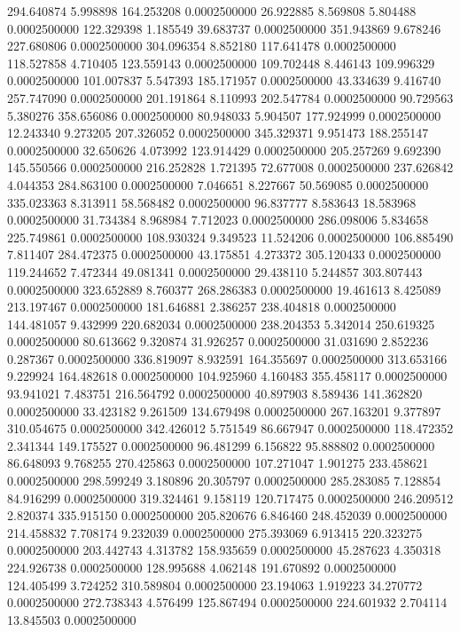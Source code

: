 294.640874 5.998898 164.253208 0.0002500000
26.922885 8.569808 5.804488 0.0002500000
122.329398 1.185549 39.683737 0.0002500000
351.943869 9.678246 227.680806 0.0002500000
304.096354 8.852180 117.641478 0.0002500000
118.527858 4.710405 123.559143 0.0002500000
109.702448 8.446143 109.996329 0.0002500000
101.007837 5.547393 185.171957 0.0002500000
43.334639 9.416740 257.747090 0.0002500000
201.191864 8.110993 202.547784 0.0002500000
90.729563 5.380276 358.656086 0.0002500000
80.948033 5.904507 177.924999 0.0002500000
12.243340 9.273205 207.326052 0.0002500000
345.329371 9.951473 188.255147 0.0002500000
32.650626 4.073992 123.914429 0.0002500000
205.257269 9.692390 145.550566 0.0002500000
216.252828 1.721395 72.677008 0.0002500000
237.626842 4.044353 284.863100 0.0002500000
7.046651 8.227667 50.569085 0.0002500000
335.023363 8.313911 58.568482 0.0002500000
96.837777 8.583643 18.583968 0.0002500000
31.734384 8.968984 7.712023 0.0002500000
286.098006 5.834658 225.749861 0.0002500000
108.930324 9.349523 11.524206 0.0002500000
106.885490 7.811407 284.472375 0.0002500000
43.175851 4.273372 305.120433 0.0002500000
119.244652 7.472344 49.081341 0.0002500000
29.438110 5.244857 303.807443 0.0002500000
323.652889 8.760377 268.286383 0.0002500000
19.461613 8.425089 213.197467 0.0002500000
181.646881 2.386257 238.404818 0.0002500000
144.481057 9.432999 220.682034 0.0002500000
238.204353 5.342014 250.619325 0.0002500000
80.613662 9.320874 31.926257 0.0002500000
31.031690 2.852236 0.287367 0.0002500000
336.819097 8.932591 164.355697 0.0002500000
313.653166 9.229924 164.482618 0.0002500000
104.925960 4.160483 355.458117 0.0002500000
93.941021 7.483751 216.564792 0.0002500000
40.897903 8.589436 141.362820 0.0002500000
33.423182 9.261509 134.679498 0.0002500000
267.163201 9.377897 310.054675 0.0002500000
342.426012 5.751549 86.667947 0.0002500000
118.472352 2.341344 149.175527 0.0002500000
96.481299 6.156822 95.888802 0.0002500000
86.648093 9.768255 270.425863 0.0002500000
107.271047 1.901275 233.458621 0.0002500000
298.599249 3.180896 20.305797 0.0002500000
285.283085 7.128854 84.916299 0.0002500000
319.324461 9.158119 120.717475 0.0002500000
246.209512 2.820374 335.915150 0.0002500000
205.820676 6.846460 248.452039 0.0002500000
214.458832 7.708174 9.232039 0.0002500000
275.393069 6.913415 220.323275 0.0002500000
203.442743 4.313782 158.935659 0.0002500000
45.287623 4.350318 224.926738 0.0002500000
128.995688 4.062148 191.670892 0.0002500000
124.405499 3.724252 310.589804 0.0002500000
23.194063 1.919223 34.270772 0.0002500000
272.738343 4.576499 125.867494 0.0002500000
224.601932 2.704114 13.845503 0.0002500000
